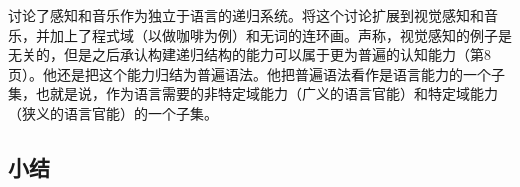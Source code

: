 
\citet[--114]{CJ2005a}讨论了感知和音乐作为独立于语言的递归系统。\citet{Jackendoff2011a}将这个讨论扩展到视觉感知和音乐，并加上了程式域（以做咖啡为例）和无词的连环画。\citet[--8]{Chomsky2007a}声称，视觉感知的例子是无关的，但是之后承认构建递归结构的能力可以属于更为普遍的认知能力（第8页）。他还是把这个能力归结为普遍语法。他把普遍语法看作是语言能力的一个子集，也就是说，作为语言需要的非特定域能力（广义的语言官能）和特定域能力（狭义的语言官能）的一个子集。

\subsection{小结}
\label{Abschnitt-Universalien-Zusammenfassung}

